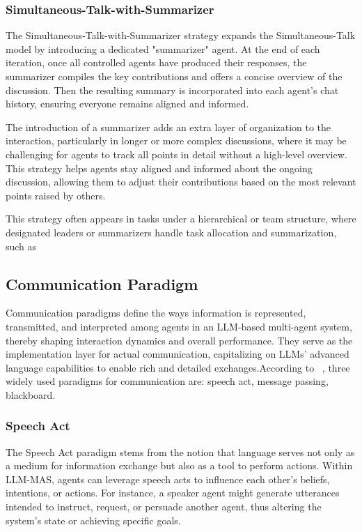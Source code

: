 \subsubsection{Simultaneous-Talk-with-Summarizer}
The Simultaneous-Talk-with-Summarizer strategy expands the Simultaneous-Talk model by introducing a dedicated "summarizer" agent. At the end of each iteration, once all controlled agents have produced their responses, the summarizer compiles the key contributions and offers a concise overview of the discussion. Then the resulting summary is incorporated into each agent's chat history, ensuring everyone remains aligned and informed. 

The introduction of a summarizer adds an extra layer of organization to the interaction, particularly in longer or more complex discussions, where it may be challenging for agents to track all points in detail without a high-level overview. This strategy helps agents stay aligned and informed about the ongoing discussion, allowing them to adjust their contributions based on the most relevant points raised by others. 

This strategy often appears in tasks under a hierarchical or team structure, where designated leaders or summarizers handle task allocation and summarization, such as ~\cite{casualgpt_reasoning,fincon_decision_making,social_media_regulation,agentcoord,polca_mas_for_political,recon_thinking}

\subsection{Communication Paradigm}
Communication paradigms define the ways information is represented, transmitted, and interpreted among agents in an LLM-based multi-agent system, thereby shaping interaction dynamics and overall performance. They serve as the implementation layer for actual communication, capitalizing on LLMs’ advanced language capabilities to enable rich and detailed exchanges.According to ~\cite{mas_a_survey}, three widely used paradigms for communication are: speech act, message passing, blackboard.

\subsubsection{Speech Act}
The Speech Act paradigm stems from the notion that language serves not only as a medium for information exchange but also as a tool to perform actions. Within LLM-MAS, agents can leverage speech acts to influence each other's beliefs, intentions, or actions. For instance, a speaker agent might generate utterances intended to instruct, request, or persuade another agent, thus altering the system's state or achieving specific goals.


